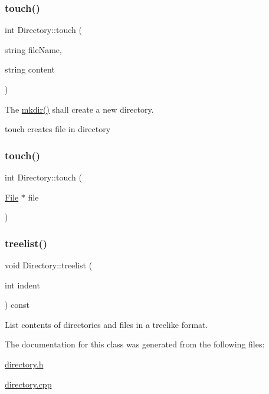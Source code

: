 \mbox{\label{class_directory_abe82fee2bf7d59d277133848d8c9833d}} 
\subsubsection{\texorpdfstring{touch()}{touch()}\hspace{0.1cm}{\footnotesize\ttfamily [1/2]}}
{\footnotesize\ttfamily int Directory\+::touch (\begin{DoxyParamCaption}\item[{string}]{file\+Name,  }\item[{string}]{content }\end{DoxyParamCaption})}



The \hyperlink{class_directory_adfec0eb4ee88844c1483363b14543e92}{mkdir()} shall create a new directory. 

touch creates file in directory \mbox{\label{class_directory_ab78fbd1a38c3e9f3926372f9fb2ccf5e}} 
\subsubsection{\texorpdfstring{touch()}{touch()}\hspace{0.1cm}{\footnotesize\ttfamily [2/2]}}
{\footnotesize\ttfamily int Directory\+::touch (\begin{DoxyParamCaption}\item[{\hyperlink{class_file}{File} $\ast$}]{file }\end{DoxyParamCaption})}

\mbox{\label{class_directory_af21c038562a88b24df0cb6e0c361febd}} 
\subsubsection{\texorpdfstring{treelist()}{treelist()}}
{\footnotesize\ttfamily void Directory\+::treelist (\begin{DoxyParamCaption}\item[{int}]{indent }\end{DoxyParamCaption}) const}



List contents of directories and files in a treelike format. 



The documentation for this class was generated from the following files\+:\begin{DoxyCompactItemize}
\item 
\hyperlink{directory_8h}{directory.\+h}\item 
\hyperlink{directory_8cpp}{directory.\+cpp}\end{DoxyCompactItemize}
